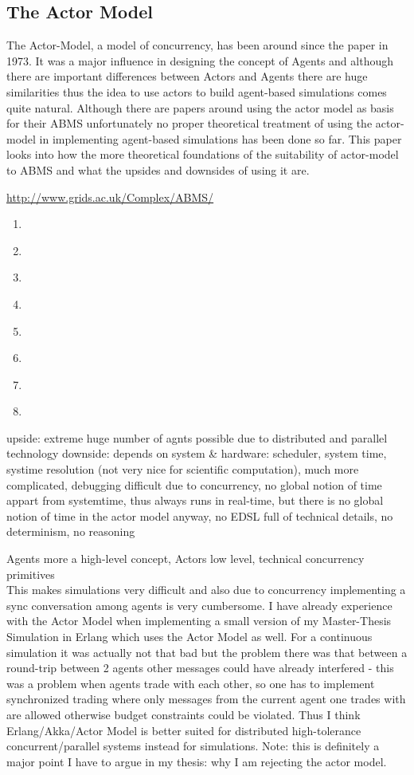 \subsection{The Actor Model}
The Actor-Model, a model of concurrency, has been around since the paper \cite{hewitt_universal_1973} in 1973. It was a major influence in designing the concept of Agents and although there are important differences between Actors and Agents there are huge similarities thus the idea to use actors to build agent-based simulations comes quite natural. Although there are papers around using the actor model as basis for their ABMS unfortunately no proper theoretical treatment of using the actor-model in implementing agent-based simulations has been done so far. This paper looks into how the more theoretical foundations of the suitability of actor-model to ABMS and what the upsides and downsides of using it are.

\url{http://www.grids.ac.uk/Complex/ABMS/}

\begin{enumerate}
\item \cite{Hewitt_1973}
\item \cite{Greif_1975}
\item \cite{Clinger_1981}
\item \cite{Agha_1986}
\item \cite{Agha_1997}
\item \cite{Hewitt_2007}
\item \cite{Hewitt_2010}
\item \cite{Agha_2004}
\end{enumerate}

upside: extreme huge number of agnts possible due to distributed and parallel technology 
downside: depends on system \& hardware: scheduler, system time, systime resolution (not very nice for scientific computation), much more complicated, debugging difficult due to concurrency, no global notion of time appart from systemtime, thus always runs in real-time, but there is no global notion of time in the actor model anyway, no EDSL full of technical details, no determinism, no reasoning

Agents more a high-level concept, Actors low level, technical concurrency primitives\\

This makes simulations very difficult and also due to concurrency implementing a sync conversation among agents is very cumbersome. I have already experience with the Actor Model when implementing a small version of my Master-Thesis Simulation in Erlang which uses the Actor Model as well. For a continuous simulation it was actually not that bad but the problem there was that between a round-trip between 2 agents other messages could have already interfered - this was a problem when agents trade with each other, so one has to implement synchronized trading where only messages from the current agent one trades with are allowed otherwise budget constraints could be violated. Thus I think Erlang/Akka/Actor Model is better suited for distributed high-tolerance concurrent/parallel systems instead for simulations. Note: this is definitely a major point I have to argue in my thesis: why I am rejecting the actor model.

